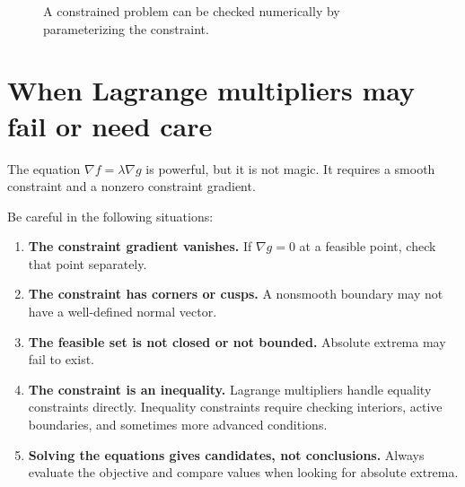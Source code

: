\documentclass[11pt]{article}
\newcommand{\grad}{\nabla}
\begin{document}
\begin{figure}[H]
\centering
{}
\caption{A constrained problem can be checked numerically by parameterizing the constraint.}
\end{figure}

\section{When Lagrange multipliers may fail or need care}

The equation $\grad f=\lambda \grad g$ is powerful, but it is not magic. It requires a smooth constraint and a nonzero constraint gradient.

Be careful in the following situations:
\begin{enumerate}
  \item \textbf{The constraint gradient vanishes.} If $\grad g=0$ at a feasible point, check that point separately.
  \item \textbf{The constraint has corners or cusps.} A nonsmooth boundary may not have a well-defined normal vector.
  \item \textbf{The feasible set is not closed or not bounded.} Absolute extrema may fail to exist.
  \item \textbf{The constraint is an inequality.} Lagrange multipliers handle equality constraints directly. Inequality constraints require checking interiors, active boundaries, and sometimes more advanced conditions.
  \item \textbf{Solving the equations gives candidates, not conclusions.} Always evaluate the objective and compare values when looking for absolute extrema.
\end{enumerate}
\end{document}
